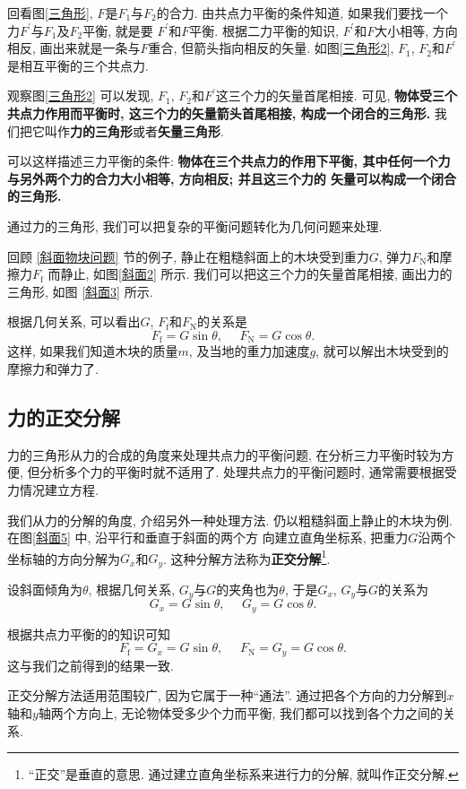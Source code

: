 \documentclass[11pt,a4paper]{ctexbook}
\newcommand{\bre}{\ \ \ }
\begin{document}
回看图\ref{三角形}, $F$是$F_1$与$F_2$的合力. 由共点力平衡的条件知道, 如果我们要找一个力$F^{\prime}$与$F_1$及$F_2$平衡, 就是要
$F^{\prime}$和$F$平衡. 根据二力平衡的知识, $F^{\prime}$和$F$大小相等, 方向相反, 画出来就是一条与$F$重合,
但箭头指向相反的矢量. 如图\ref{三角形2}, $F_1$, $F_2$和$F^{\prime}$是相互平衡的三个共点力.

观察图\ref{三角形2} 可以发现, $F_1$, $F_2$和$F^{\prime}$这三个力的矢量首尾相接.
可见, \textbf{物体受三个共点力作用而平衡时, 这三个力的矢量箭头首尾相接, 构成一个闭合的三角形.}
我们把它叫作\textbf{力的三角形}或者\textbf{矢量三角形}.

可以这样描述三力平衡的条件: \textbf{物体在三个共点力的作用下平衡, 其中任何一个力与另外两个力的合力大小相等, 方向相反; 并且这三个力的
矢量可以构成一个闭合的三角形.}

通过力的三角形, 我们可以把复杂的平衡问题转化为几何问题来处理.

回顾 \ref{斜面物块问题} 节的例子, 静止在粗糙斜面上的木块受到重力$G$, 弹力$F_\text{N}$和摩擦力$F_\text{f}$
而静止, 如图\ref{斜面2} 所示. 我们可以把这三个力的矢量首尾相接, 画出力的三角形, 如图 \ref{斜面3} 所示.

根据几何关系, 可以看出$G$, $F_\text{f}$和$F_\text{N}$的关系是
$$F_\text{f} = G\sin\theta,\bre\bre F_\text{N} = G\cos\theta. $$
这样, 如果我们知道木块的质量$m$, 及当地的重力加速度$g$, 就可以解出木块受到的摩擦力和弹力了.

\subsection{力的正交分解}

力的三角形从力的合成的角度来处理共点力的平衡问题, 在分析三力平衡时较为方便, 但分析多个力的平衡时就不适用了.
处理共点力的平衡问题时, 通常需要根据受力情况建立方程.

我们从力的分解的角度, 介绍另外一种处理方法. 仍以粗糙斜面上静止的木块为例.
在图\ref{斜面5} 中, 沿平行和垂直于斜面的两个方
向建立直角坐标系, 把重力$G$沿两个坐标轴的方向分解为$G_x$和$G_y$.
这种分解方法称为\textbf{正交分解}\footnote{``正交''是垂直的意思. 通过建立直角坐标系来进行力的分解, 就叫作正交分解.}.

设斜面倾角为$\theta$, 根据几何关系, $G_y$与$G$的夹角也为$\theta$, 于是$G_x$, $G_y$与$G$的关系为
$$G_x = G\sin\theta, \bre\bre G_y = G\cos\theta.$$

根据共点力平衡的的知识可知
$$F_\text{f} = G_x = G\sin\theta, \bre\bre F_\text{N} = G_y = G\cos\theta. $$
这与我们之前得到的结果一致.

正交分解方法适用范围较广, 因为它属于一种``通法''. 通过把各个方向的力分解到$x$轴和$y$轴两个方向上,
无论物体受多少个力而平衡, 我们都可以找到各个力之间的关系.
\end{document}
